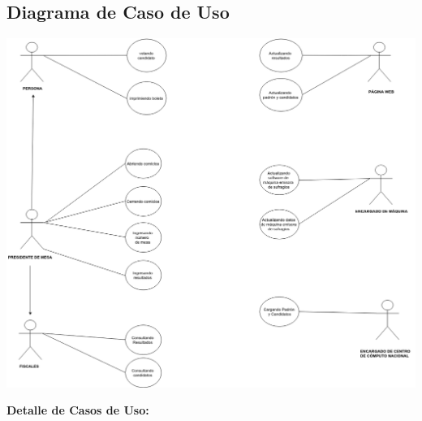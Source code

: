 \documentclass[spanish, 10pt,a4paper]{article}
\numberwithin{equation}{section} %
\begin{document}
\subsection{Diagrama de Caso de Uso}

\vspace{\baselineskip}
    \begin{center}
                \includegraphics[scale=0.40]{imagenes/CasosDeUso.png}
                \\
                \vspace{1pt}
                \footnotesize\textit{}
        \end{center}
\vspace{\baselineskip}

\newpage

\noindent\textbf{Detalle de Casos de Uso:}\\
\end{document}
